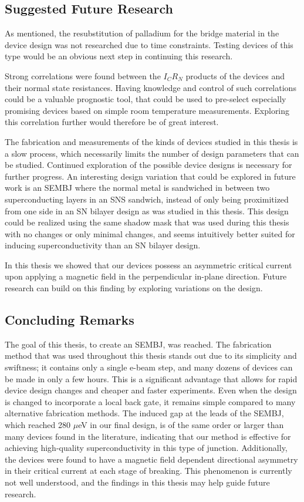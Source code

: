 \subsection{Suggested Future Research}

As mentioned, the resubstitution of palladium for the bridge material in the device design was not researched due to time constraints. Testing devices of this type would be an obvious next step in continuing this research.

Strong correlations were found between the $I_CR_N$ products of the devices and their normal state resistances. Having knowledge and control of such correlations could be a valuable prognostic tool, that could be used to pre-select especially promising devices based on simple room temperature measurements. Exploring this correlation further would therefore be of great interest.

The fabrication and measurements of the kinds of devices studied in this thesis is a slow process, which necessarily limits the number of design parameters that can be studied. Continued exploration of the possible device designs is necessary for further progress. An interesting design variation that could be explored in future work is an SEMBJ where the normal metal is sandwiched in between two superconducting layers in an SNS sandwich, instead of only being proximitized from one side in an SN bilayer design as was studied in this thesis. This design could be realized using the same shadow mask that was used during this thesis with no changes or only minimal changes, and seems intuitively better suited for inducing superconductivity than an SN bilayer design.

In this thesis we showed that our devices possess an asymmetric critical current upon applying a magnetic field in the perpendicular in-plane direction. Future research can build on this finding by exploring variations on the design. 

\subsection{Concluding Remarks}

The goal of this thesis, to create an SEMBJ, was reached. The fabrication method that was used throughout this thesis stands out due to its simplicity and swiftness; it contains only a single e-beam step, and many dozens of devices can be made in only a few hours. This is a significant advantage that allows for rapid device design changes and cheaper and faster experiments. Even when the design is changed to incorporate a local back gate, it remains simple compared to many alternative fabrication methods. The induced gap at the leads of the SEMBJ, which reached 280 $\mu$eV in our final design, is of the same order or larger than many devices found in the literature, indicating that our method is effective for achieving high-quality superconductivity in this type of junction. Additionally, the devices were found to have a magnetic field dependent directional asymmetry in their critical current at each stage of breaking. This phenomenon is currently not well understood, and the findings in this thesis may help guide future research.

